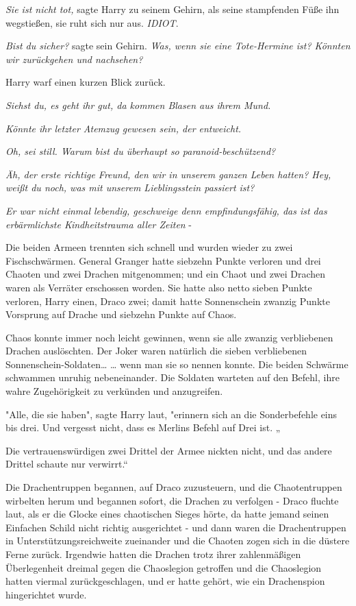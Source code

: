 {\emph{Sie ist nicht tot,} sagte Harry zu seinem Gehirn, als seine stampfenden Füße ihn wegstießen, sie ruht sich nur aus. \emph{IDIOT}.

\emph{Bist du sicher?} sagte sein Gehirn. \emph{Was, wenn sie eine Tote-Hermine ist? Könnten wir zurückgehen und nachsehen?}

Harry warf einen kurzen Blick zurück.

\emph{Siehst du, es geht ihr gut, da kommen Blasen aus ihrem Mund.}

\emph{Könnte ihr letzter Atemzug gewesen sein, der entweicht.}

\emph{Oh, sei still. Warum bist du überhaupt so paranoid-beschützend?}

\emph{Äh, der erste richtige Freund, den wir in unserem ganzen Leben hatten? Hey, weißt du noch, was mit unserem Lieblingsstein passiert ist?}

\emph{Er war nicht einmal lebendig, geschweige denn empfindungsfähig, das ist das erbärmlichste Kindheitstrauma aller Zeiten} -

Die beiden Armeen trennten sich schnell und wurden wieder zu zwei Fischschwärmen. General Granger hatte siebzehn Punkte verloren und drei Chaoten und zwei Drachen mitgenommen; und ein Chaot und zwei Drachen waren als Verräter erschossen worden. Sie hatte also netto sieben Punkte verloren, Harry einen, Draco zwei; damit hatte Sonnenschein zwanzig Punkte Vorsprung auf Drache und siebzehn Punkte auf Chaos.

Chaos konnte immer noch leicht gewinnen, wenn sie alle zwanzig verbliebenen Drachen auslöschten. Der Joker waren natürlich die sieben verbliebenen Sonnenschein-Soldaten… … wenn man sie so nennen konnte. Die beiden Schwärme schwammen unruhig nebeneinander. Die Soldaten warteten auf den Befehl, ihre wahre Zugehörigkeit zu verkünden und anzugreifen.

"Alle, die sie haben", sagte Harry laut, "erinnern sich an die Sonderbefehle eins bis drei. Und vergesst nicht, dass es Merlins Befehl auf Drei ist. „

Die vertrauenswürdigen zwei Drittel der Armee nickten nicht, und das andere Drittel schaute nur verwirrt.“

Die Drachentruppen begannen, auf Draco zuzusteuern, und die Chaotentruppen wirbelten herum und begannen sofort, die Drachen zu verfolgen - Draco fluchte laut, als er die Glocke eines chaotischen Sieges hörte, da hatte jemand seinen Einfachen Schild nicht richtig ausgerichtet - und dann waren die Drachentruppen in Unterstützungsreichweite zueinander und die Chaoten zogen sich in die düstere Ferne zurück. Irgendwie hatten die Drachen trotz ihrer zahlenmäßigen Überlegenheit dreimal gegen die Chaoslegion getroffen und die Chaoslegion hatten viermal zurückgeschlagen, und er hatte gehört, wie ein Drachenspion hingerichtet wurde.

}
